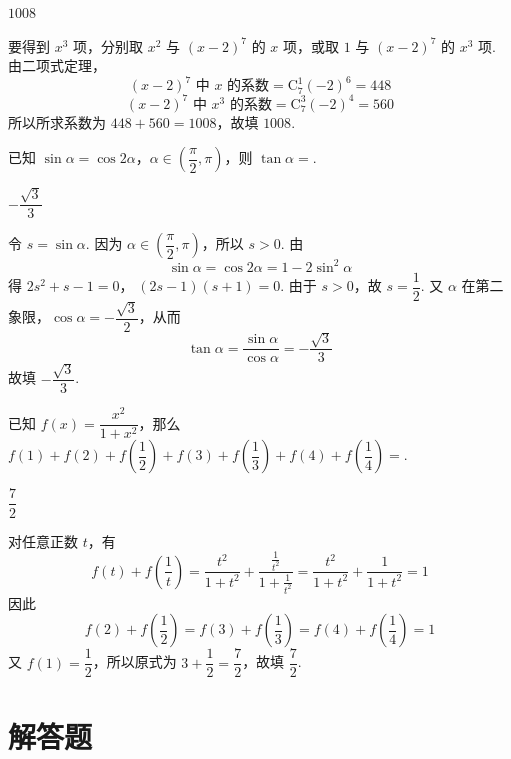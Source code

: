\begin{answer}
\(1008\)
\end{answer}

\begin{solution}
要得到 \(x^3\) 项，分别取 \(x^2\) 与 \((x-2)^7\) 的 \(x\) 项，或取 \(1\) 与 \((x-2)^7\) 的 \(x^3\) 项. 由二项式定理，
\[
\text{\((x-2)^7\) 中 \(x\) 的系数}=\mathrm C_7^1(-2)^6=448
\]
\[
\text{\((x-2)^7\) 中 \(x^3\) 的系数}=\mathrm C_7^3(-2)^4=560
\]
所以所求系数为 \(448+560=1008\)，故填 \(1008\).
\end{solution}

\begin{problem}
已知 \(\sin \alpha = \cos 2\alpha\)，\(\alpha \in \left(\dfrac{\pi}{2}, \pi\right)\)，则 \(\tan \alpha =\)\fillinblank{}.
\end{problem}

\begin{answer}
\(-\dfrac{\sqrt{3}}{3}\)
\end{answer}

\begin{solution}
令 \(s=\sin\alpha\). 因为 \(\alpha\in\left(\dfrac\pi2,\pi\right)\)，所以 \(s>0\). 由
\[
\sin\alpha=\cos2\alpha=1-2\sin^2\alpha
\]
得
\(2s^2+s-1=0\)，\(\; (2s-1)(s+1)=0\).
由于 \(s>0\)，故 \(s=\dfrac12\). 又 \(\alpha\) 在第二象限，\(\cos\alpha=-\dfrac{\sqrt3}{2}\)，从而
\[
\tan\alpha=\frac{\sin\alpha}{\cos\alpha}=-\frac{\sqrt3}{3}
\]
故填 \(-\dfrac{\sqrt3}{3}\).
\end{solution}

\begin{problem}
已知 \(f(x) = \dfrac{x^{2}}{1 + x^{2}}\)，那么 \(f(1) + f(2) + f\left(\dfrac{1}{2}\right) + f(3) + f\left(\dfrac{1}{3}\right) + f(4) + f\left(\dfrac{1}{4}\right) =\)\fillinblank{}.
\end{problem}

\begin{answer}
\(\dfrac{7}{2}\)
\end{answer}

\begin{solution}
对任意正数 \(t\)，有
\[
f(t)+f\left(\frac1t\right)=\frac{t^2}{1+t^2}+\frac{\frac{1}{t^2}}{1+\frac{1}{t^2}}=\frac{t^2}{1+t^2}+\frac1{1+t^2}=1
\]
因此
\[
f(2)+f\left(\frac12\right)=f(3)+f\left(\frac13\right)=f(4)+f\left(\frac14\right)=1
\]
又 \(f(1)=\dfrac12\)，所以原式为 \(3+\dfrac12=\dfrac72\)，故填 \(\dfrac72\).
\end{solution}

\section{解答题}

